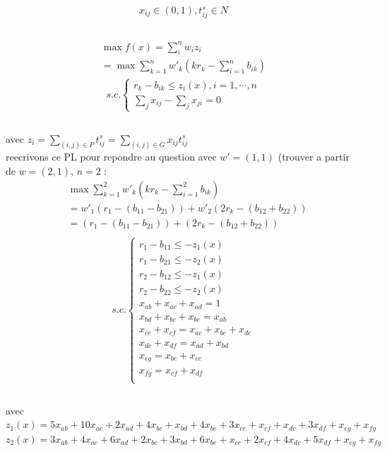 \documentclass[16pt, a4paper]{article}
\begin{document}
\begin{flushleft}
\begin{justify}
$$x_{ij} \in (0,1), t_{ij}^s \in N$$ 

\subsection{}
\begin{align*}
    \max f(x) =  \sum_{i}^n w_iz_i\\
     = \max \sum_{k=1}^n w'_k(kr_k- \sum_{i=1}^n b_{ik})
\end{align*}
\begin{align*}
       s.c.\begin{cases}
        r_k - b_{ik} \leq z_i(x) , i = 1,\cdots,n\\
        \sum_j x_{ij} - \sum_j x_{ji} = 0
        \end{cases}\\
\end{align*}\\
avec $z_{i} = \sum_{(i,j) \in P } t_{ij}^s =  \sum_{(i,j) \in G} x_{ij}t_{ij}^s$\\

reecrivons ce PL pour repondre au question avec $w' = (1,1)$ (trouver a partir de $w = (2,1)$, $n =2$  : 
\begin{align*}
    & \max \sum_{k=1}^2 w'_k(kr_k- \sum_{i=1}^2 b_{ik})\\
    & = w'_1(r_1 - (b_{11} - b_{21})) + w'_2(2r_k - (b_{12} + b_{22})) \\
    & = (r_1 - (b_{11} - b_{21})) + (2r_k - (b_{12} + b_{22})) \\
\end{align*}
\begin{align*}
       s.c.\begin{cases}
        r_1 - b_{11} \leq -z_1(x)\\
        r_1 - b_{21} \leq -z_2(x) \\
        r_2 - b_{12} \leq -z_1(x) \\
        r_2 - b_{22} \leq -z_2(x) \\
        x_{ab} + x_{ac} + x_{ad} = 1\\
        x_{bd} + x_{bc} + x_{be} = x_{ab}\\
        x_{ce} + x_{cf} = x_{ac} + x_{bc} + x_{dc}\\
        x_{dc} + x_{df} = x_{ad} + x_{bd}\\
        x_{eg} = x_{be} + x_{ce}\\
        x_{fg} = x_{cf} + x_{df}\\
        \end{cases}\\
\end{align*}\\
avec $z_{1}(x) = 5x_{ab}+10x_{ac}+2x_{ad} + 4x_{bc} + x_{bd} + 4x_{be}  +  3x_{ce} + x_{cf} +  x_{dc} + 3x_{df} + x_{eg} + x_{fg}$\\
$z_2(x) = 3x_{ab}+ 4x_{ac}+6x_{ad} + 2x_{bc} + 3x_{bd} + 6x_{be}  +  x_{ce} + 2x_{cf} +  4x_{dc} + 5x_{df} + x_{eg} + x_{fg}$




\newpage
\end{justify}
\end{flushleft}
\end{document}

